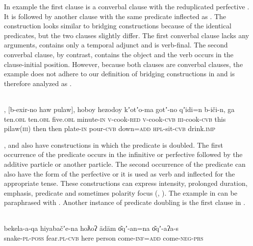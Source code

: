 \documentclass[output=paper]{LSP/langsci}
\begin{document}
In example  the first clause is a converbal clause with the reduplicated perfective . It is followed by another clause with the same predicate inflected as  . The construction looks similar to bridging constructions because of the identical predicates, but the two clauses slightly differ. The first converbal clause lacks any arguments, contains only a temporal adjunct and is verb-final. The second converbal clause, by contrast, contains the object and the verb occurs in the clause-initial position. However, because both clauses are converbal clauses, the example does not adhere to our definition of bridging constructions in  and is therefore analyzed as .

\begin{exe}
	\ex	\label{ex:20ab} 
	\\
			, [b-exir-no  haw  pulaw],  hoboy hezodoy kʼotʼo-ma   gotʼ-no  qʼidi=n    b-iči-n, ga\\
			ten.\textsc{obl}  ten.\textsc{obl} five.\textsc{obl} minute-\textsc{in}  \textsc{v}-cook-\textsc{red} \textsc{v}-cook-\textsc{cvb} \textsc{iii}-cook-\textsc{cvb} this pilaw(\textsc{iii})  then  then    plate-\textsc{in}    pour-\textsc{cvb} down=\textsc{add}  \textsc{hpl}-sit-\textsc{cvb} drink.\textsc{imp} \\
		\glt	{}
\end{exe}

,  and  also have constructions in which the predicate is doubled. The first occurrence of the predicate occurs in the infinitive or perfective  followed by the additive particle or another particle. The second occurrence of the predicate can also have the form of the perfective  or it is used as  verb and inflected for the appropriate tense. These constructions can express intensity, prolonged duration, emphasis, predicate  and sometimes polarity focus (\citealt{Maisak.2010}, \citealt{Forker.2015}). The  example in  can be paraphrased with . Another instance of predicate doubling is the first  clause in .

\ea\label{ex:26ab} 
\\
\gll bekela-a-qa      hiyabačʼe-na  hoƛoʔ ädäm       o͂qʼ-an=na o͂qʼ-aʔa-s \\
snake-\textsc{pl}-\textsc{poss} fear.\textsc{pl}-\textsc{cvb} here    person come-\textsc{inf=add}   come-\textsc{neg-prs}\\
\glt {}
\z
\end{document}
